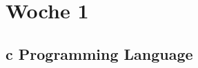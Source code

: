 \documentclass[english]{latex4ei/latex4ei_sheet}
\begin{document}
\section{Woche 1}
\begin{sectionbox}
	\subsection{c Programming Language}

	
\end{sectionbox}



\end{document}
